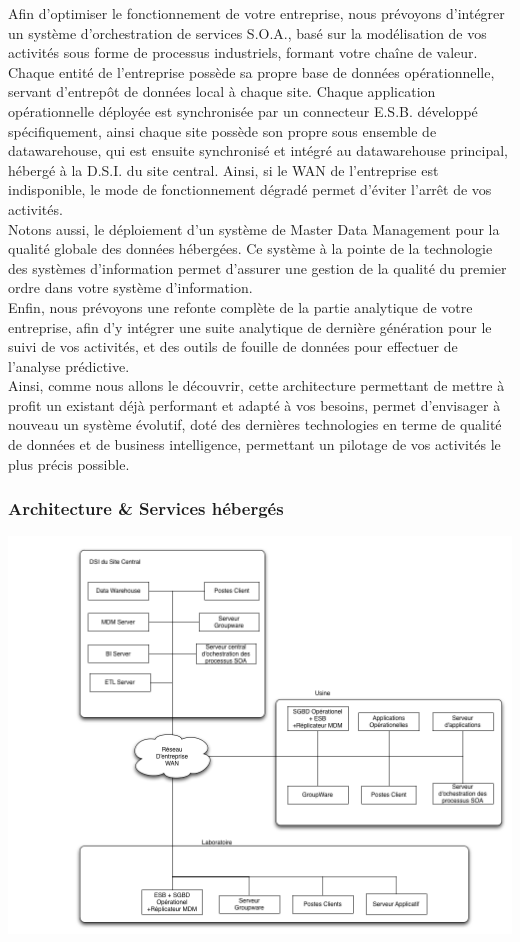 Afin d'optimiser le fonctionnement de votre entreprise, nous prévoyons d'intégrer un système d'orchestration de services S.O.A., basé sur la modélisation de vos activités sous forme de processus industriels, formant votre chaîne de valeur.\\
Chaque entité de l'entreprise possède sa propre base de données opérationnelle, servant d'entrepôt de données local à chaque site. Chaque application opérationnelle déployée est synchronisée par un connecteur E.S.B. développé spécifiquement, ainsi chaque site possède son propre sous ensemble de datawarehouse, qui est ensuite synchronisé et intégré au datawarehouse principal, hébergé à la D.S.I. du site central. Ainsi, si le WAN de l'entreprise est indisponible, le mode de fonctionnement dégradé permet d'éviter l'arrêt de vos activités.\\
Notons aussi, le déploiement d'un système de Master Data Management pour la qualité globale des données hébergées. Ce système à la pointe de la technologie des systèmes d'information permet d'assurer une gestion de la qualité du premier ordre dans votre système d'information.\\
Enfin, nous prévoyons une refonte complète de la partie analytique de votre entreprise, afin d'y intégrer une suite analytique de dernière génération pour le suivi de vos activités, et des outils de fouille de données pour effectuer de l'analyse prédictive.\\

Ainsi, comme nous allons le découvrir, cette architecture permettant de mettre à profit un existant déjà performant et adapté à vos besoins, permet d'envisager à nouveau un système évolutif, doté des dernières technologies en terme de qualité de données et de business intelligence, permettant un pilotage de vos activités le plus précis possible.\\

\subsubsection{Architecture \& Services hébergés}

\includegraphics[scale=0.2]{DiagrameSOAPdc4.png}

